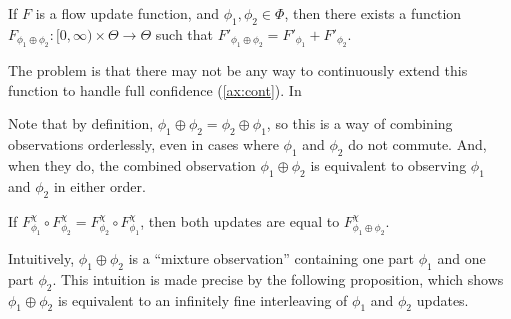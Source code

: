 \begin{prop}
	If $F$ is a flow update function, and $\phi_1, \phi_2 \in \Phi$, 
	then there exists a function 
	$F_{\phi_1 \oplus \phi_2}
	 	: [0, \infty) \times \Theta \to \Theta$
	such that
	$F'_{\phi_1 \oplus \phi_2} = F'_{\phi_1} + F'_{\phi_2}$.
\end{prop}
% 
The problem is that there may not be any way to continuously extend
this function to handle full confidence (\cref{ax:cont}). In

Note that by definition, $\phi_1 \oplus \phi_2 = \phi_2 \oplus \phi_1$,
so this is a way of combining observations orderlessly, even in cases
where $\phi_1$ and $\phi_2$ do not commute.
And, when they do, the combined observation $\phi_1\oplus \phi_2$
is equivalent to observing $\phi_1$ and $\phi_2$ in either order.

\begin{prop}
	If $F^{\chi}_{\phi_1} \circ F^{\chi}_{\phi_2} =
	 	F^{\chi}_{\phi_2} \circ F^{\chi}_{\phi_1}$,
	then both updates are equal to
	 $F^{\chi}_{\phi_1 \oplus \phi_2}$. %
\end{prop}

Intuitively, $\phi_1 \oplus \phi_2$ is a ``mixture observation'' containing
one part $\phi_1$ and one part $\phi_2$. This intuition is made
precise by the following proposition,
which shows $\phi_1\oplus\phi_2$ is equivalent to an infinitely
fine interleaving of $\phi_1$ and $\phi_2$ updates.

